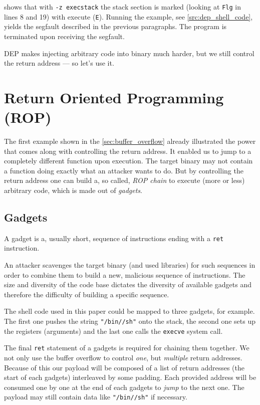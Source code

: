 \documentclass[article]{uibk}
\begin{document}
 shows that with \texttt{-z execstack} the stack section
is marked (looking at \texttt{Flg} in lines 8 and 19) with execute
(\texttt{E}). Running the example, see \cref{src:dep_shell_code}, yields the
segfault described in the previous paragraphs. The program is terminated upon
receiving the segfault.

DEP makes injecting arbitrary code into binary much harder, but we still
control the return address --- so let's use it.

\section{Return Oriented Programming (ROP)}

The first example shown in the \cref{sec:buffer_overflow} already illustrated
the power that comes along with controlling the return address. It enabled us
to jump to a completely different function upon execution. The target binary
may not contain a function doing exactly what an attacker wants to do. But by
controlling the return address one can build a, so called, \textit{ROP chain}
to execute (more or less) arbitrary code, which is made out of
\textit{gadgets}.~\cite{wiki:rop,buchanan2008good,shacham2007}

\subsection{Gadgets}

A gadget is a, usually short, sequence of instructions ending with a
\texttt{ret} instruction.

An attacker scavenges the target binary (and used libraries) for such sequences
in order to combine them to build a new, malicious sequence of instructions.
The size and diversity of the code base dictates the diversity of available
gadgets and therefore the difficulty of building a specific sequence.

The shell code used in this paper could be mapped to three gadgets, for
example. The first one pushes the string \texttt{"/bin//sh"} onto the stack,
the second one sets up the registers (arguments) and the last one calls the
\texttt{execve} system call.

The final \texttt{ret} statement of a gadgets is required for chaining them
together. We not only use the buffer overflow to control \emph{one}, but
\emph{multiple} return addresses. Because of this our payload will be composed
of a list of return addresses (the start of each gadgets) interleaved by some
padding. Each provided address will be consumed one by one at the end of each
gadgets to \emph{jump} to the next one. The payload may still contain data like
\texttt{"/bin//sh"} if necessary.
\end{document}
